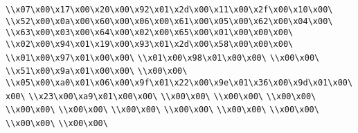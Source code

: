 \verb|\\x07\x00\x17\x00\x20\x00\x92\x01\x2d\x00\x11\x00\x2f\x00\x10\x00\|\newline
\verb|\\x52\x00\x0a\x00\x60\x00\x06\x00\x61\x00\x05\x00\x62\x00\x04\x00\|\newline
\verb|\\x63\x00\x03\x00\x64\x00\x02\x00\x65\x00\x01\x00\x00\x00\|\newline
\verb|\\x02\x00\x94\x01\x19\x00\x93\x01\x2d\x00\x58\x00\x00\x00\|\newline
\verb|\\x01\x00\x97\x01\x00\x00\|\newline
\verb|\\x01\x00\x98\x01\x00\x00\|\newline
\verb|\\x00\x00\|\newline
\verb|\\x51\x00\x9a\x01\x00\x00\|\newline
\verb|\\x00\x00\|\newline
\verb|\\x05\x00\xa0\x01\x06\x00\x9f\x01\x22\x00\x9e\x01\x36\x00\x9d\x01\x00\x00\|\newline
\verb|\\x23\x00\xa9\x01\x00\x00\|\newline
\verb|\\x00\x00\|\newline
\verb|\\x00\x00\|\newline
\verb|\\x00\x00\|\newline
\verb|\\x00\x00\|\newline
\verb|\\x00\x00\|\newline
\verb|\\x00\x00\|\newline
\verb|\\x00\x00\|\newline
\verb|\\x00\x00\|\newline
\verb|\\x00\x00\|\newline
\verb|\\x00\x00\|\newline
\verb|\\x00\x00\|\newline
